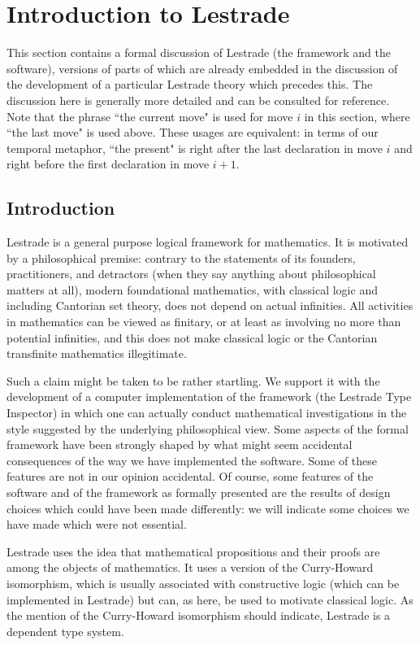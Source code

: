 \documentclass[12pt]{article}
\begin{document}
\section{Introduction to Lestrade}

This section contains a formal discussion of Lestrade (the framework and the software), versions of parts of which are already embedded in the discussion of the development of a particular Lestrade theory which precedes this.  The discussion here is generally more detailed and can be consulted for reference.  Note that the phrase ``the current move" is used for move $i$ in this section, where ``the last move" is used above.  These usages are equivalent:  in terms of our temporal metaphor, ``the present" is right after the last declaration in move $i$ and right before the first declaration in move $i+1$.

\subsection{Introduction}

Lestrade is a general purpose logical framework for mathematics.  It is motivated by a philosophical premise:  contrary to the statements of its founders, practitioners, and detractors (when they say anything about philosophical matters at all), modern foundational mathematics, with classical logic and including Cantorian set theory, does not depend on actual infinities.  All activities in mathematics can be viewed as finitary, or at least as involving no more than potential infinities, and this does not make classical logic or the Cantorian transfinite mathematics illegitimate.

Such a claim might be taken to be rather startling.  We support it with the development of a computer implementation of the framework (the Lestrade Type Inspector) in which one can actually conduct mathematical investigations in the style suggested by the underlying philosophical view.  Some aspects of the formal framework have been strongly shaped by what might seem accidental consequences of the way we have implemented the software.  Some of these features are not in our opinion accidental.  Of course, some features of the software and of the framework as formally presented are the results of design choices which could have been made differently:  we will indicate some choices we have made which were not essential.

Lestrade uses the idea that mathematical propositions and their proofs are among the objects of mathematics.  It uses a version of the Curry-Howard isomorphism, which is usually associated with constructive logic (which can be implemented in Lestrade) but can, as here, be used to motivate classical logic.
As the mention of the Curry-Howard isomorphism should indicate, Lestrade is a dependent type system.
\end{document}
